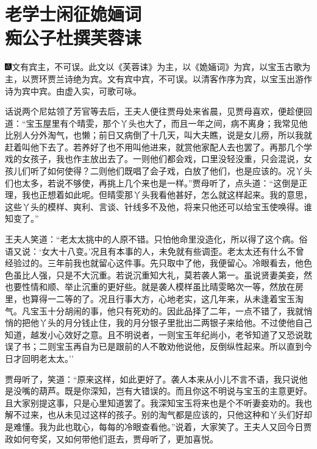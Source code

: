 
\chapter{老学士闲征姽婳词\\痴公子杜撰芙蓉诔}
{\includegraphics[width=3mm]{../Images/00005}\kaishu 文有宾主，不可误。此文以《芙蓉诔》为主，以《}姽婳{\kaishu 词》为宾，以宝玉古歌为主，以贾环贾兰诗绝为宾。文有宾中宾，不可误。以清客作序为宾，以宝玉出游作诗为宾中宾。由虚入实，可歌可咏。}

话说两个尼姑领了芳官等去后，王夫人便往贾母处来省晨，见贾母喜欢，便趁便回道：``宝玉屋里有个晴雯，那个丫头也大了，而且一年之间，病不离身；我常见他比别人分外淘气，也懒；前日又病倒了十几天，叫大夫瞧，说是女儿痨，所以我就赶着叫他下去了。若养好了也不用叫他进来，就赏他家配人去也罢了。再那几个学戏的女孩子，我也作主放出去了。一则他们都会戏，口里没轻没重，只会混说，女孩儿们听了如何使得？二则他们既唱了会子戏，白放了他们，也是应该的。况丫头们也太多，若说不够使，再挑上几个来也是一样。''贾母听了，点头道：``这倒是正理，我也正想着如此呢。但晴雯那丫头我看他甚好，怎么就这样起来。我的意思，这些丫头的模样、爽利、言谈、针线多不及他，将来只他还可以给宝玉使唤得。谁知变了。''

王夫人笑道：``老太太挑中的人原不错。只怕他命里没造化，所以得了这个病。俗语又说：`女大十八变。'况且有本事的人，未免就有些调歪。老太太还有什么不曾经验过的。三年前我也就留心这件事。先只取中了他，我便留心。冷眼看去，他色色虽比人强，只是不大沉重。若说沉重知大礼，莫若袭人第一。虽说贤妻美妾，然也要性情和顺、举止沉重的更好些。就是袭人模样虽比晴雯略次一等，然放在房里，也算得一二等的了。况且行事大方，心地老实，这几年来，从未逢着宝玉淘气。凡宝玉十分胡闹的事，他只有死劝的。因此品择了二年，一点不错了，我就悄悄的把他丫头的月分钱止住，我的月分银子里批出二两银子来给他。不过使他自己知道，越发小心效好之意。且不明说者，一则宝玉年纪尚小，老爷知道了又恐说耽误了书；二则宝玉再自为已是跟前的人不敢劝他说他，反倒纵性起来。所以直到今日才回明老太太。''

贾母听了，笑道：``原来这样，如此更好了。袭人本来从小儿不言不语，我只说他是没嘴的葫芦。既是你深知，岂有大错误的。而且你这不明说与宝玉的主意更好。且大家别提这事，只是心里知道罢了。我深知宝玉将来也是个不听妻妾劝的。我也解不过来，也从未见过这样的孩子。别的淘气都是应该的，只他这种和丫头们好却是难懂。我为此也耽心，每每的冷眼查看他。''说着，大家笑了。王夫人又回今日贾政如何夸奖，又如何带他们逛去，贾母听了，更加喜悦。

